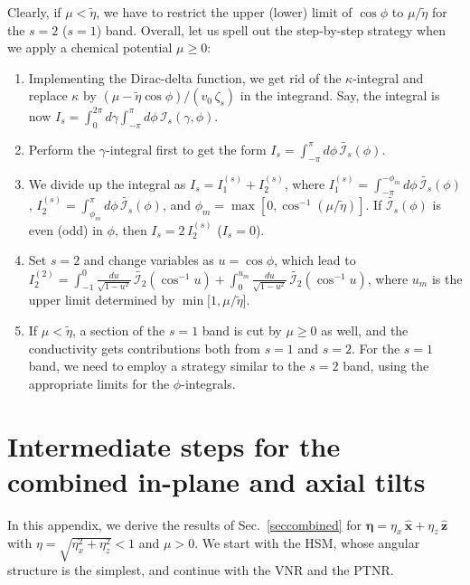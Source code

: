 \documentclass[aps,prb,onecolumn,nofootinbib,citeautoscript,10pt]{revtex4-2}
\newcommand{\bs}[1]{\boldsymbol{#1}}
\begin{document}
Clearly, if $  \mu < \tilde \eta $, we have to restrict the upper (lower) limit of $\cos \phi $ to $  \mu / \tilde \eta$ for the $s=2$ ($s=1$) band. Overall, let us spell out the step-by-step strategy when we apply a chemical potential $\mu \geq 0 $: 
\begin{enumerate}
\item Implementing the Dirac-delta function, we get rid of the $\kappa $-integral and replace $\kappa $ by $ (\mu - \tilde \eta \cos \phi ) /(v_0\, \zeta_s) $ in the integrand. Say, the integral is now $I_s = \int_0^{2\pi} d\gamma \int_{-\pi}^{\pi} d \phi \,\mathcal{I}_s (\gamma, \phi)$.

\item Perform the $\gamma$-integral first to get the form $I_s =  \int_{-\pi}^{\pi} d \phi \,\tilde{\mathcal{I}_s } (\phi)$.

\item We divide up the integral as $I_s = I_1^{(s)} + I_2^{(s)} $, where $ I_1^{(s)} = 
\int_{-\pi}^{ - \phi_m } d \phi \, \tilde{\mathcal{I}_s} (\phi) $,
$ I_2^{(s)} =  \int_{\phi_m}^{\pi} d \phi \,\tilde{\mathcal{I}_s} (\phi)$, and $\phi_{m}= \max[0, \cos^{-1}(\mu/\tilde \eta ) ]$. If $\tilde{\mathcal{I}_s} (\phi)$ is even (odd) in $\phi$, then $I_s = 2\, I_2^{(s)}$ ($I_s =  0$).

\item Set $s= 2$ and change variables as $ u = \cos \phi $, which lead to $ I_2^{(2)} =  \int_{-1}^{0} 
\frac{d u}{\sqrt {1-u^2}} \,\tilde {\mathcal{I}_2} (\cos^{-1} u) + \int_{0}^{u_m} 
\frac{d u}{\sqrt {1-u^2}} \,\tilde {\mathcal{I}_2} (\cos^{-1} u) $, where $u_m$ is the upper limit determined by $ \min [1, {\mu} /{ \tilde \eta } \big]$.

\item If $ {\mu} < \tilde \eta  $, a section of the $s=1 $ band is cut by $\mu \geq 0$ as well, and the conductivity gets contributions both from $s=1$ and $s=2$. For the $s=1$ band, we need to employ a strategy similar to the $s=2$ band, using the appropriate limits for the $\phi$-integrals.

\end{enumerate}

\section{Intermediate steps for the combined in-plane and axial tilts}
\label{appcomb}


In this appendix, we derive the results of Sec.~\ref{seccombined} for $\bs\eta=\eta_x\,\hat{\bs x}+\eta_z\,\hat{\bs z}$ with $\eta=\sqrt{\eta_x^2+\eta_z^2}<1$ and $\mu>0$. We start with the HSM, whose angular structure is the simplest, and continue with the VNR and the PTNR.
\end{document}
